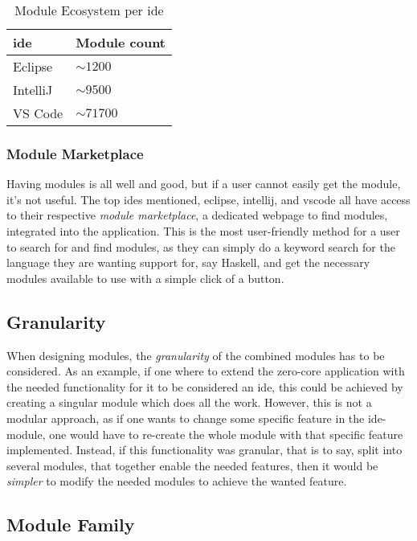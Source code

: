 \begin{table}[]
  \centering
  \caption{Module Ecosystem per \gls*{ide}}
  \label{tbl:mod}
  \begin{tabular}{|l|l|}
    \hline
    \gls*{ide} & Module count \\ \hline
    Eclipse & $\sim1200$ \\ \hline
    IntelliJ & $\sim9500$ \\ \hline
    VS Code & $\sim71700$ \\ \hline
  \end{tabular}
\end{table}

\subsubsection{Module Marketplace}

Having modules is all well and good, but if a user cannot easily get the
module, it's not useful. The top \gls*{ide}s mentioned, \gls*{eclipse},
\gls*{intellij}, and \gls*{vscode} all have access to their respective
\textit{module marketplace}, a dedicated webpage to find modules, integrated
into the application. This is the most user-friendly method for a user to search
for and find modules, as they can simply do a keyword search for the language
they are wanting support for, say Haskell, and get the necessary modules
available to use with a simple click of a button.

\subsection{Granularity}

When designing modules, the \textit{granularity} of the combined modules has to
be considered. As an example, if one where to extend the zero-core application
with the needed functionality for it to be considered an \gls*{ide}, this could be
achieved by creating a singular module which does all the work. However, this
is not a modular approach, as if one wants to change some specific feature in
the \gls*{ide}-module, one would have to re-create the whole module with that
specific feature implemented. Instead, if this functionality was granular,
that is to say, split into several modules, that together enable the needed
features, then it would be \textit{simpler} to modify the needed modules to
achieve the wanted feature.


\subsection{Module Family}

